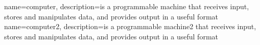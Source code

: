  {
   name=computer,
   description={is a programmable machine that receives input,
                stores and manipulates data, and provides
                output in a useful format}
}
 {
   name=computer2,
   description={is a programmable machine2 that receives input,
                stores and manipulates data, and provides
                output in a useful format}
}